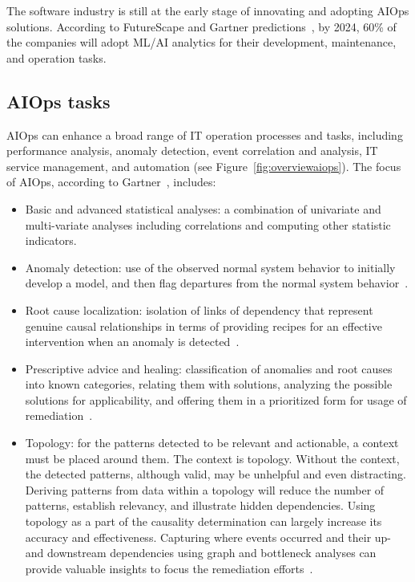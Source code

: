 The software industry is still at the early stage of innovating and adopting AIOps solutions. According to FutureScape and Gartner predictions~\cite{futurescape2018worldwide, gartnerinc}, by 2024, 60\% of the companies will adopt ML/AI analytics for their development, maintenance, and operation tasks.

\subsection{AIOps tasks}\label{ch:background:sec:aiops:subsec:tasks}
AIOps can enhance a broad range of IT operation processes and tasks, including performance analysis, anomaly detection, event correlation and analysis, IT service management, and automation (see Figure~\ref{fig:overviewaiops}). The focus of AIOps, according to Gartner~\cite{gartnerinc,gartnermarketguide}, includes:
\begin{itemize}
    \item Basic and advanced statistical analyses: a combination of univariate and multi-variate analyses including correlations and computing other statistic indicators.
    \item Anomaly detection: use of the observed normal system behavior to initially develop a model, and then flag departures from the normal system behavior~\cite{yeanomalycloud,liu2016anomaly,vrushali2016anomaly,zhou2017anomaly}.
    \item Root cause localization: isolation of links of dependency that represent genuine causal relationships in terms of providing recipes for an effective intervention when an anomaly is detected~\cite{lou2010mining,fraenkel2004root,dalal2013empirical,nedelkoski2020rca,meng2020localizing}.
    \item Prescriptive advice and healing: classification of anomalies and root causes into known categories, relating them with solutions, analyzing the possible solutions for applicability, and offering them in a prioritized form for usage of remediation~\cite{sidiroglou2009assure,dashofy2002towards}.
    \item Topology: for the patterns detected to be relevant and actionable, a context must be placed around them. The context is topology. Without the context, the detected patterns, although valid, may be unhelpful and even distracting. Deriving patterns from data within a topology will reduce the number of patterns, establish relevancy, and illustrate hidden dependencies. Using topology as a part of the causality determination can largely increase its accuracy and effectiveness. Capturing where events occurred and their up- and downstream dependencies using graph and bottleneck analyses can provide valuable insights to focus the remediation efforts~\cite{donnet2005efficient,donnet2005improved,donnet2007internet, keller2007methods,muntonimining}.
\end{itemize}

